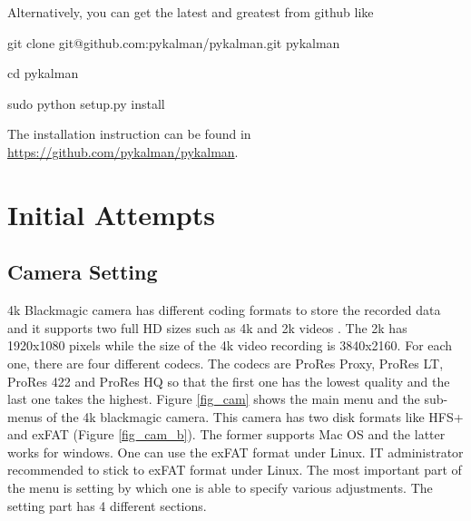 \documentclass[[12pt,DIV14,BCOR12mm,a4paper,footexclude,headinclude,halfparskip-,twoside,openright,cleardoubleempty,idxtotoc,bibtotoc]{article}
\begin{document}
Alternatively, you can get the latest and greatest from github like 

 \begin{framed}

git clone git@github.com:pykalman/pykalman.git pykalman

cd pykalman

 sudo python setup.py install

\end{framed} 

The installation instruction can be found in \url{https://github.com/pykalman/pykalman}.


\section{Initial Attempts}

\subsection{Camera Setting}

4k Blackmagic camera has different coding formats to store the recorded data and it supports two full HD sizes such as 4k and 2k videos . The 2k has 1920x1080 pixels while the size of the 4k video recording is 3840x2160. For each one, there are four different codecs. The codecs are ProRes Proxy, ProRes LT, ProRes 422 and ProRes HQ so that the first one has the lowest quality and the last one takes the highest. Figure \ref{fig_cam} shows the main menu and the sub-menus of the 4k blackmagic camera. This camera has two  disk formats like HFS+ and exFAT (Figure \ref{fig_cam_b}). The former supports Mac OS and the latter works for windows. One can use the exFAT format under Linux. IT administrator  recommended to stick to exFAT format under Linux. The most important part of the menu is setting by which one is able to specify various adjustments. The setting part has 4 different sections.  
\end{document}
